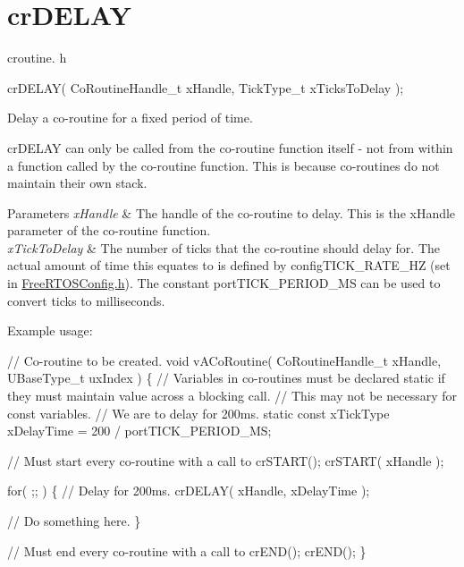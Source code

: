 \hypertarget{group__cr_d_e_l_a_y}{}\section{cr\+D\+E\+L\+AY}
\label{group__cr_d_e_l_a_y}
croutine. h 
\begin{DoxyPre}
crDELAY( CoRoutineHandle\_t xHandle, TickType\_t xTicksToDelay );\end{DoxyPre}


Delay a co-\/routine for a fixed period of time.

cr\+D\+E\+L\+AY can only be called from the co-\/routine function itself -\/ not from within a function called by the co-\/routine function. This is because co-\/routines do not maintain their own stack.


\begin{DoxyParams}{Parameters}
{\em x\+Handle} & The handle of the co-\/routine to delay. This is the x\+Handle parameter of the co-\/routine function.\\
\hline
{\em x\+Tick\+To\+Delay} & The number of ticks that the co-\/routine should delay for. The actual amount of time this equates to is defined by config\+T\+I\+C\+K\+\_\+\+R\+A\+T\+E\+\_\+\+HZ (set in \mbox{\hyperlink{_free_r_t_o_s_config_8h_source}{Free\+R\+T\+O\+S\+Config.\+h}}). The constant port\+T\+I\+C\+K\+\_\+\+P\+E\+R\+I\+O\+D\+\_\+\+MS can be used to convert ticks to milliseconds.\\
\hline
\end{DoxyParams}
Example usage\+: 
\begin{DoxyPre}
// Co-routine to be created.
void vACoRoutine( CoRoutineHandle\_t xHandle, UBaseType\_t uxIndex )
\{
// Variables in co-routines must be declared static if they must maintain value across a blocking call.
// This may not be necessary for const variables.
// We are to delay for 200ms.
static const xTickType xDelayTime = 200 / portTICK\_PERIOD\_MS;\end{DoxyPre}



\begin{DoxyPre}    // Must start every co-routine with a call to crSTART();
    crSTART( xHandle );\end{DoxyPre}



\begin{DoxyPre}    for( ;; )
    \{
       // Delay for 200ms.
       crDELAY( xHandle, xDelayTime );\end{DoxyPre}



\begin{DoxyPre}       // Do something here.
    \}\end{DoxyPre}



\begin{DoxyPre}    // Must end every co-routine with a call to crEND();
    crEND();
\}\end{DoxyPre}
 